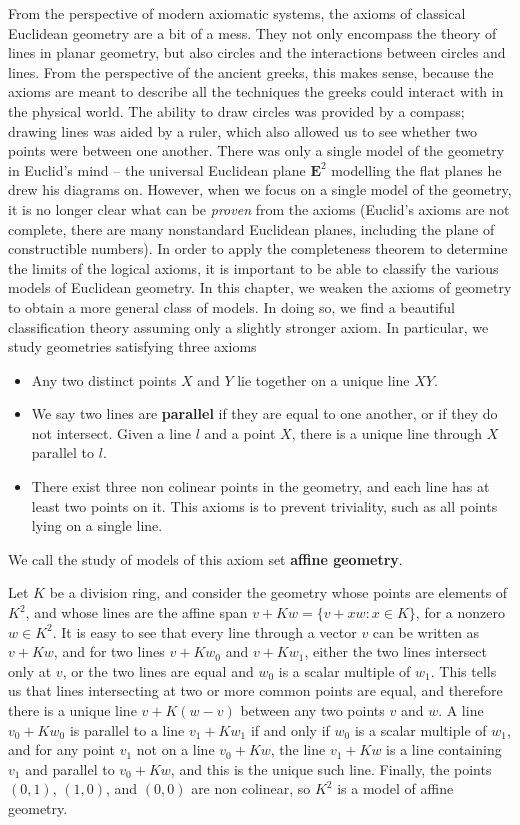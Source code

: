 From the perspective of modern axiomatic systems, the axioms of classical Euclidean geometry are a bit of a mess. They not only encompass the theory of lines in planar geometry, but also circles and the interactions between circles and lines. From the perspective of the ancient greeks, this makes sense, because the axioms are meant to describe all the techniques the greeks could interact with in the physical world. The ability to draw circles was provided by a compass; drawing lines was aided by a ruler, which also allowed us to see whether two points were between one another. There was only a single model of the geometry in Euclid's mind -- the universal Euclidean plane $\mathbf{E}^2$ modelling the flat planes he drew his diagrams on. However, when we focus on a single model of the geometry, it is no longer clear what can be {\it proven} from the axioms (Euclid's axioms are not complete, there are many nonstandard Euclidean planes, including the plane of constructible numbers). In order to apply the completeness theorem to determine the limits of the logical axioms, it is important to be able to classify the various models of Euclidean geometry. In this chapter, we weaken the axioms of geometry to obtain a more general class of models. In doing so, we find a beautiful classification theory assuming only a slightly stronger axiom. In particular, we study geometries satisfying three axioms
%
\begin{itemize}
    \item Any two distinct points $X$ and $Y$ lie together on a unique line $XY$.
    \item We say two lines are {\bf parallel} if they are equal to one another, or if they do not intersect. Given a line $l$ and a point $X$, there is a unique line through $X$ parallel to $l$.
    \item There exist three non colinear points in the geometry, and each line has at least two points on it. This axioms is to prevent triviality, such as all points lying on a single line.
\end{itemize}
%
We call the study of models of this axiom set {\bf affine geometry}.

\begin{example}
    Let $K$ be a division ring, and consider the geometry whose points are elements of $K^2$, and whose lines are the affine span $v + Kw = \{ v + xw : x \in K \}$, for a nonzero $w \in K^2$. It is easy to see that every line through a vector $v$ can be written as $v + Kw$, and for two lines $v + Kw_0$ and $v + Kw_1$, either the two lines intersect only at $v$, or the two lines are equal and $w_0$ is a scalar multiple of $w_1$. This tells us that lines intersecting at two or more common points are equal, and therefore there is a unique line $v + K(w-v)$ between any two points $v$ and $w$. A line $v_0 + Kw_0$ is parallel to a line $v_1 + Kw_1$ if and only if $w_0$ is a scalar multiple of $w_1$, and for any point $v_1$ not on a line $v_0 + Kw$, the line $v_1 + Kw$ is a line containing $v_1$ and parallel to $v_0 + Kw$, and this is the unique such line. Finally, the points $(0,1)$, $(1,0)$, and $(0,0)$ are non colinear, so $K^2$ is a model of affine geometry.
\end{example}

